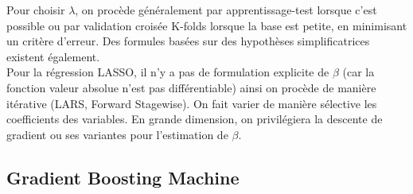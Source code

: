 \documentclass[french]{article}
\begin{document}
\begin{multicols}{2}
Pour choisir $\lambda$, on procède généralement par apprentissage-test lorsque c'est possible ou par validation croisée K-folds lorsque la base est petite, en minimisant un critère d'erreur. Des formules basées sur des hypothèses simplificatrices existent également.\\

Pour la régression LASSO, il n'y a pas de formulation explicite de $\beta$ (car la fonction valeur absolue n'est pas différentiable) ainsi on procède de manière itérative (LARS, Forward Stagewise). On fait varier de manière sélective les coefficients des variables. En grande dimension, on privilégiera la descente de gradient ou ses variantes pour l'estimation de $\beta$.\\





\subsection{Gradient Boosting Machine}

\end{multicols}
\end{document}
